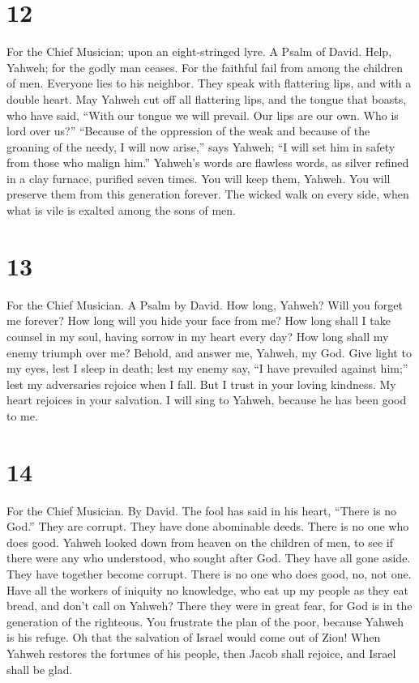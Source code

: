 \hypertarget{section-11}{%
\section{12}\label{section-11}}

For the Chief Musician; upon an eight-stringed lyre. A Psalm of David.
 Help, Yahweh; for the godly man ceases. For the faithful
fail from among the children of men.  Everyone lies to his
neighbor. They speak with flattering lips, and with a double heart.
 May Yahweh cut off all flattering lips, and the tongue that
boasts,  who have said, ``With our tongue we will prevail.
Our lips are our own. Who is lord over us?''  ``Because of
the oppression of the weak and because of the groaning of the needy, I
will now arise,'' says Yahweh; ``I will set him in safety from those who
malign him.''  Yahweh's words are flawless words, as silver
refined in a clay furnace, purified seven times.  You will
keep them, Yahweh. You will preserve them from this generation forever.
 The wicked walk on every side, when what is vile is exalted
among the sons of men.

\hypertarget{section-12}{%
\section{13}\label{section-12}}

For the Chief Musician. A Psalm by David.  How long, Yahweh?
Will you forget me forever? How long will you hide your face from me?
 How long shall I take counsel in my soul, having sorrow in
my heart every day? How long shall my enemy triumph over me?
 Behold, and answer me, Yahweh, my God. Give light to my
eyes, lest I sleep in death;  lest my enemy say, ``I have
prevailed against him;'' lest my adversaries rejoice when I fall.
 But I trust in your loving kindness. My heart rejoices in
your salvation.  I will sing to Yahweh, because he has been
good to me.

\hypertarget{section-13}{%
\section{14}\label{section-13}}

For the Chief Musician. By David.  The fool has said in his
heart, ``There is no God.'' They are corrupt. They have done abominable
deeds. There is no one who does good.  Yahweh looked down
from heaven on the children of men, to see if there were any who
understood, who sought after God.  They have all gone aside.
They have together become corrupt. There is no one who does good, no,
not one.  Have all the workers of iniquity no knowledge, who
eat up my people as they eat bread, and don't call on Yahweh?
 There they were in great fear, for God is in the generation
of the righteous.  You frustrate the plan of the poor,
because Yahweh is his refuge.  Oh that the salvation of
Israel would come out of Zion! When Yahweh restores the fortunes of his
people, then Jacob shall rejoice, and Israel shall be glad.

